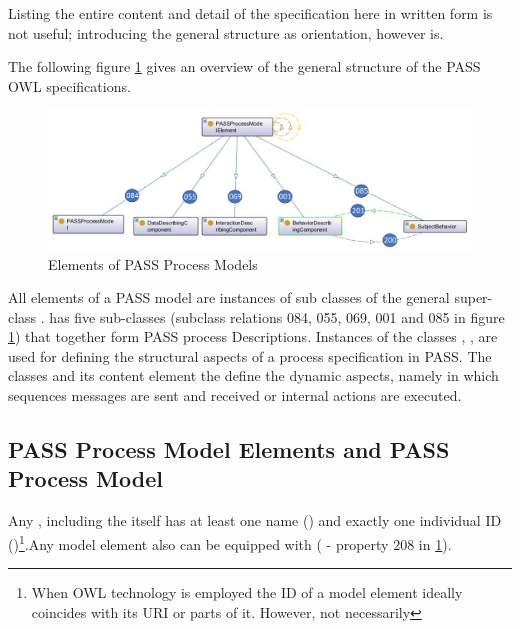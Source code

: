 Listing the entire content and detail of the specification here in written form is not useful; introducing the general structure as orientation, however is. 

The following figure \ref{fig:20171217-passprocessmodellelement} gives an overview of the general structure of the PASS OWL specifications. 


\begin{figure}[htbp]
	\centering
	\includegraphics[width=0.9\linewidth]{Figures/Ontology/SubjectInteraction/20171217-PASSProcessModellElement}
	\caption[Elements of PASS Process Models]{Elements of PASS Process Models}
	\label{fig:20171217-passprocessmodellelement}
\end{figure}

All elements of a PASS model are instances of sub classes of the general super-class .
 has five sub-classes (subclass relations 084, 055, 069, 001 and 085 in figure \ref{fig:20171217-passprocessmodellelement}) that together form PASS process Descriptions. Instances of the classes , ,  are used for defining the structural aspects of a process specification in PASS. The classes  and its content element the   define the dynamic aspects, namely in which sequences messages are sent and received or internal actions are executed.

\subsection{PASS Process Model Elements and PASS Process Model}

Any , including the   itself has at least one name () and exactly one individual ID ()\footnote{When OWL technology is employed the ID of a model element ideally coincides with its URI or parts of it. However, not necessarily}.Any model element also can be equipped with  ( - property 208 in \ref{fig:20171217-passprocessmodellelement}). 

